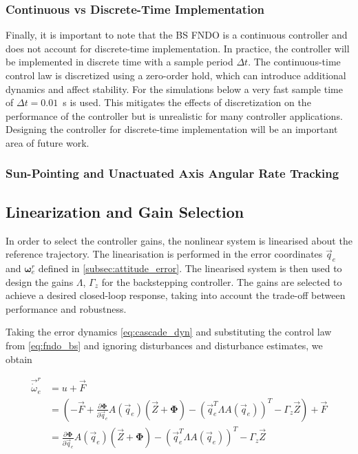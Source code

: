 \subsubsection{Continuous vs Discrete-Time Implementation}
Finally, it is important to note that the BS FNDO is a continuous controller and does not account for discrete-time implementation. In practice, the controller will be implemented in discrete time with a sample period $\Delta t$. The continuous-time control law is discretized using a zero-order hold, which can introduce additional dynamics and affect stability. For the simulations below a very fast sample time of $\Delta t = 0.01$~s is used. This mitigates the effects of discretization on the performance of the controller but is unrealistic for many controller applications. Designing the controller for discrete-time implementation will be an important area of future work.

\subsubsection{Sun-Pointing and Unactuated Axis Angular Rate Tracking}


\subsection{Linearization and Gain Selection}

In order to select the controller gains, the nonlinear system is linearised about the reference trajectory. The linearisation is performed in the error coordinates $\vec{q}_e$ and $\boldsymbol{\omega}^r_e$ defined in \autoref{subsec:attitude_error}. The linearised system is then used to design the gains $\Lambda$, $\Gamma_z$ for the backstepping controller. The gains are selected to achieve a desired closed-loop response, taking into account the trade-off between performance and robustness.

Taking the error dynamics \autoref{eq:cascade_dyn} and substituting the control law from \eqref{eq:fndo_bs} and ignoring disturbances and disturbance estimates, we obtain

\begin{align*}
    \vec{\dot{\omega}}^r_e &= u + \vec{F} \\
    &= (- \vec{F} + \frac{\partial\boldsymbol{\Phi}}{\partial\vec{q}_e}A(\vec{q}_e)(\vec{Z} + \boldsymbol{\Phi})
    - \left(\vec{q}_e^T \Lambda A(\vec{q}_e)\right)^T - \Gamma_z \vec{Z}) + \vec{F} \\
    &= \frac{\partial\boldsymbol{\Phi}}{\partial\vec{q}_e}A(\vec{q}_e)(\vec{Z} + \boldsymbol{\Phi})
    - \left(\vec{q}_e^T \Lambda A(\vec{q}_e)\right)^T - \Gamma_z \vec{Z}
\end{align*}

